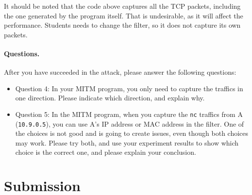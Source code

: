 It should be noted that the code above captures all the TCP
packets, including the one generated by the program itself. That is
undesirable, as it will affect
the performance. Students needs to change the filter, so it does not capture
its own packets.

\paragraph{Questions.} After you have succeeded in the attack, please 
answer the following questions: 

\begin{itemize}
  \item Question 4: In your MITM program, you only need to capture 
    the traffics in one direction. Please indicate which direction, 
    and explain why.

  \item Question 5: In the MITM program, when you capture the 
    \texttt{nc} traffics from A (\texttt{10.9.0.5}), 
    you can use A's IP address or MAC address in the filter. 
    One of the choices is not good and is going to create issues, 
    even though both choices may work. 
    Please try both, and use your experiment results to 
    show which choice is the correct one, and please
    explain your conclusion.
\end{itemize}
 



\section{Submission}








